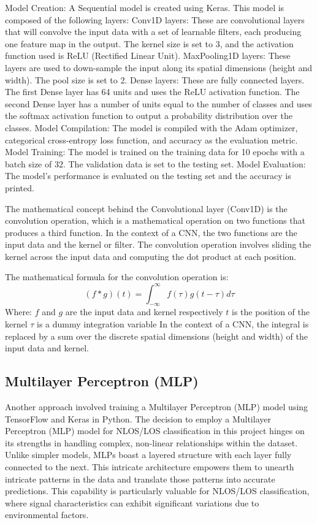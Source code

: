 \documentclass[
	a4paper, %
	11pt, %
]{CSUniSchoolLabReport}
\begin{document}
Model Creation: A Sequential model is created using Keras. This model is composed of the following layers: 
Conv1D layers: These are convolutional layers that will convolve the input data with a set of learnable filters, each producing one feature map in the output. The kernel size is set to 3, and the activation function used is ReLU (Rectified Linear Unit).  
MaxPooling1D layers: These layers are used to down-sample the input along its spatial dimensions (height and width). The pool size is set to 2.  
Dense layers: These are fully connected layers. The first Dense layer has 64 units and uses the ReLU activation function. The second Dense layer has a number of units equal to the number of classes and uses the softmax activation function to output a probability distribution over the classes.  
Model Compilation: The model is compiled with the Adam optimizer, categorical cross-entropy loss function, and accuracy as the evaluation metric.  
Model Training: The model is trained on the training data for 10 epochs with a batch size of 32. The validation data is set to the testing set.  
Model Evaluation: The model's performance is evaluated on the testing set and the accuracy is printed.  

The mathematical concept behind the Convolutional layer (Conv1D) is the convolution operation, which is a mathematical operation on two functions that produces a third function. In the context of a CNN, the two functions are the input data and the kernel or filter. The convolution operation involves sliding the kernel across the input data and computing the dot product at each position.

The mathematical formula for the convolution operation is:  $$ (f * g)(t) = \int_{-\infty}^{\infty} f(\tau)g(t - \tau) d\tau $$  Where:  
$f$ and $g$ are the input data and kernel respectively
$t$ is the position of the kernel
$\tau$ is a dummy integration variable
In the context of a CNN, the integral is replaced by a sum over the discrete spatial dimensions (height and width) of the input data and kernel.

\subsection{Multilayer Perceptron (MLP)}\label{mlp}                                                                                                         
Another approach involved training a Multilayer Perceptron (MLP) model using TensorFlow and Keras in Python. The decision to employ a Multilayer Perceptron (MLP) model for NLOS/LOS classification in this project hinges on its strengths in handling complex, non-linear relationships within the dataset. Unlike simpler models, MLPs boast a layered structure with each layer fully connected to the next. This intricate architecture empowers them to unearth intricate patterns in the data and translate those patterns into accurate predictions. This capability is particularly valuable for NLOS/LOS classification, where signal characteristics can exhibit significant variations due to environmental factors.
\end{document}
